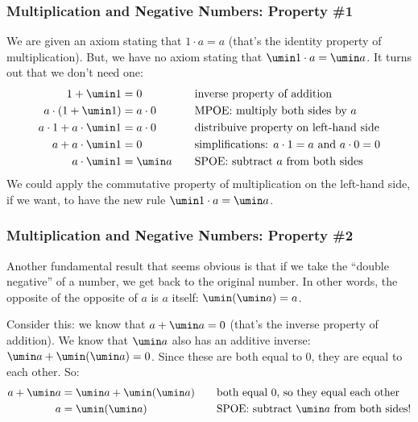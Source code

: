 \subsubsection{Multiplication and Negative Numbers: Property \#1}

We are given an axiom stating that $1 \cdot a = a$ (that's the identity property of multiplication). But, we have no axiom stating that $\umin1 \cdot a = \umin a$. It turns out that we don't need one:
\[\begin{aligned}
1 + \umin1 &= 0
&& \quad\text{inverse property of addition}
\\
a\cdot(1+\umin1) &= a\cdot0
&& \quad\text{MPOE: multiply both sides by $a$}
\\
a\cdot1 + a\cdot\umin1 &= a\cdot0
&& \quad\text{distribuive property on left-hand side}
\\
a + a\cdot\umin1 &= 0
&& \quad\text{simplifications: $a\cdot1 = a$ and $a\cdot0 = 0$}
\\
a\cdot\umin1 &= \umin a
&& \quad\text{SPOE: subtract $a$ from both sides}
\end{aligned}\]
We could apply the commutative property of multiplication on the left-hand side, if we want, to have the new rule $\umin1 \cdot a = \umin a$.

\subsubsection{Multiplication and Negative Numbers: Property \#2}
Another fundamental result that seems obvious is that if we take the ``double negative'' of a number, we get back to the original number. In other words, the opposite of the opposite of $a$ is $a$ itself: $\umin(\umin a) = a$.

Consider this: we know that $a + \umin a = 0$ (that's the inverse property of addition). We know that $\umin a$ also has an additive inverse: $\umin a + \umin(\umin a) = 0$. Since these are both equal to 0, they are equal to each other. So:
\[\begin{aligned}
a + \umin a &= \umin a + \umin(\umin a)
&& \quad\text{both equal 0, so they equal each other}
\\
a &= \umin(\umin a)
&& \quad\text{SPOE: subtract $\umin a$ from both sides!}
\end{aligned}\]

